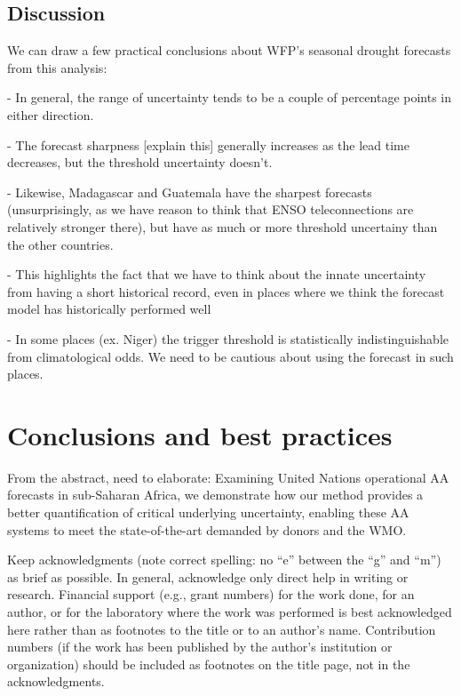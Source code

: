 \documentclass{ametsocV5}
\begin{document}
\subsection{Discussion}

We can draw a few practical conclusions about WFP's seasonal drought forecasts from this analysis:

- In general, the range of uncertainty tends to be a couple of percentage points in either direction.

- The forecast sharpness [explain this] generally increases as the lead time decreases, but the threshold uncertainty doesn't.

- Likewise, Madagascar and Guatemala have the sharpest forecasts (unsurprisingly, as we have reason to think that ENSO teleconnections are relatively stronger there), but have as much or more threshold uncertainy than the other countries.

- This highlights the fact that we have to think about the innate uncertainty from having a short historical record, even in places where we think the forecast model has historically performed well

- In some places (ex. Niger) the trigger threshold is statistically indistinguishable from climatological odds. We need to be cautious about using the forecast in such places.


\section{Conclusions and best practices}



From the abstract, need to elaborate: Examining United Nations operational AA forecasts in sub-Saharan Africa, we demonstrate how our method provides a better quantification of critical underlying uncertainty, enabling these AA systems to meet the state-of-the-art demanded by donors and the WMO.


\acknowledgments
Keep acknowledgments (note correct spelling: no ``e'' between the ``g'' and
``m'') as brief as possible. In general, acknowledge only direct help in
writing or research. Financial support (e.g., grant numbers) for the work
done, for an author, or for the laboratory where the work was performed is
best acknowledged here rather than as footnotes to the title or to an
author's name. Contribution numbers (if the work has been published by the
author's institution or organization) should be included as footnotes on the title page,
not in the acknowledgments.
\end{document}
